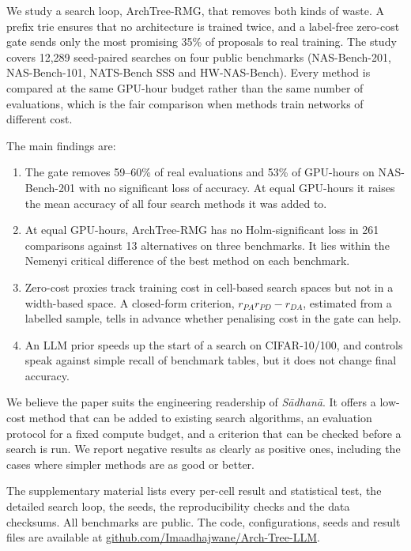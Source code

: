 \documentclass[11pt,a4paper]{article}
\newcommand{\sadhana}{\textit{S\=adhan\=a}}
\begin{document}
We study a search loop, ArchTree-RMG, that removes both kinds of waste. A prefix trie ensures that no architecture is trained twice, and a label-free zero-cost gate sends only the most promising 35\% of proposals to real training. The study covers 12,289 seed-paired searches on four public benchmarks (NAS-Bench-201, NAS-Bench-101, NATS-Bench SSS and HW-NAS-Bench). Every method is compared at the same GPU-hour budget rather than the same number of evaluations, which is the fair comparison when methods train networks of different cost.

The main findings are:
\begin{enumerate}[leftmargin=*,itemsep=2pt,topsep=0pt]
\item The gate removes 59--60\% of real evaluations and 53\% of GPU-hours on NAS-Bench-201 with no significant loss of accuracy. At equal GPU-hours it raises the mean accuracy of all four search methods it was added to.
\item At equal GPU-hours, ArchTree-RMG has no Holm-significant loss in 261 comparisons against 13 alternatives on three benchmarks. It lies within the Nemenyi critical difference of the best method on each benchmark.
\item Zero-cost proxies track training cost in cell-based search spaces but not in a width-based space. A closed-form criterion, $r_{PA}r_{PD}-r_{DA}$, estimated from a labelled sample, tells in advance whether penalising cost in the gate can help.
\item An LLM prior speeds up the start of a search on CIFAR-10/100, and controls speak against simple recall of benchmark tables, but it does not change final accuracy.
\end{enumerate}

We believe the paper suits the engineering readership of \sadhana. It offers a low-cost method that can be added to existing search algorithms, an evaluation protocol for a fixed compute budget, and a criterion that can be checked before a search is run. We report negative results as clearly as positive ones, including the cases where simpler methods are as good or better.

The supplementary material lists every per-cell result and statistical test, the detailed search loop, the seeds, the reproducibility checks and the data checksums. All benchmarks are public. The code, configurations, seeds and result files are available at \href{https://github.com/Imaadhajwane/Arch-Tree-LLM}{github.com/Imaadhajwane/Arch-Tree-LLM}.
\end{document}
